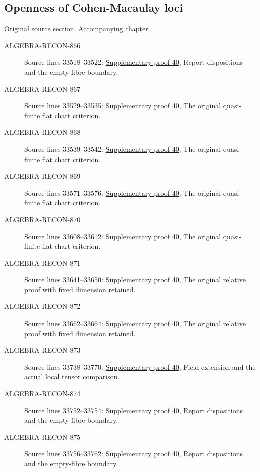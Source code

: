 \subsection{Openness of Cohen-Macaulay loci}
\hypertarget{algebra-source-section-CM-open}{}
\noindent\href{https://github.com/stacks/stacks-project/blob/a04446e57ec1fbc252a871afcec7752fb2807b14/algebra.tex\#L33515}{Original source section}. \href{algebra.pdf\#nameddest=section-CM-open}{Accompanying chapter}.

\begin{description}
\item[ALGEBRA-RECON-866] Source lines 33518--33522: \hyperlink{algebra_cm_open_notes_20260928}{Supplementary proof 40}, Report dispositions and the empty-fibre boundary.
\item[ALGEBRA-RECON-867] Source lines 33529--33535: \hyperlink{algebra_cm_open_notes_20260928}{Supplementary proof 40}, The original quasi-finite flat chart criterion.
\item[ALGEBRA-RECON-868] Source lines 33539--33542: \hyperlink{algebra_cm_open_notes_20260928}{Supplementary proof 40}, The original quasi-finite flat chart criterion.
\item[ALGEBRA-RECON-869] Source lines 33571--33576: \hyperlink{algebra_cm_open_notes_20260928}{Supplementary proof 40}, The original quasi-finite flat chart criterion.
\item[ALGEBRA-RECON-870] Source lines 33608--33612: \hyperlink{algebra_cm_open_notes_20260928}{Supplementary proof 40}, The original quasi-finite flat chart criterion.
\item[ALGEBRA-RECON-871] Source lines 33641--33650: \hyperlink{algebra_cm_open_notes_20260928}{Supplementary proof 40}, The original relative proof with fixed dimension retained.
\item[ALGEBRA-RECON-872] Source lines 33662--33664: \hyperlink{algebra_cm_open_notes_20260928}{Supplementary proof 40}, The original relative proof with fixed dimension retained.
\item[ALGEBRA-RECON-873] Source lines 33738--33770: \hyperlink{algebra_cm_open_notes_20260928}{Supplementary proof 40}, Field extension and the actual local tensor comparison.
\item[ALGEBRA-RECON-874] Source lines 33752--33754: \hyperlink{algebra_cm_open_notes_20260928}{Supplementary proof 40}, Report dispositions and the empty-fibre boundary.
\item[ALGEBRA-RECON-875] Source lines 33756--33762: \hyperlink{algebra_cm_open_notes_20260928}{Supplementary proof 40}, Report dispositions and the empty-fibre boundary.

\end{description}
